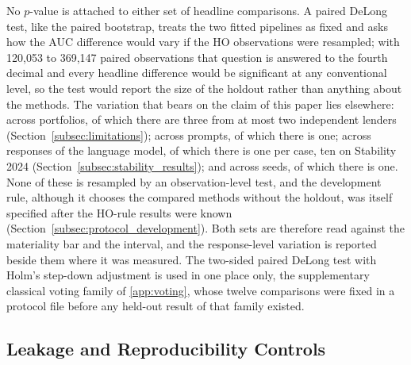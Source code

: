 \documentclass[final,5p,twocolumn]{elsarticle}
\begin{document}
No $p$-value is attached to either set of headline comparisons. A paired DeLong test, like the paired bootstrap, treats the two fitted pipelines as fixed and asks how the AUC difference would vary if the HO observations were resampled; with 120,053 to 369,147 paired observations that question is answered to the fourth decimal and every headline difference would be significant at any conventional level, so the test would report the size of the holdout rather than anything about the methods. The variation that bears on the claim of this paper lies elsewhere: across portfolios, of which there are three from at most two independent lenders (Section~\ref{subsec:limitations}); across prompts, of which there is one; across responses of the language model, of which there is one per case, ten on Stability 2024 (Section~\ref{subsec:stability_results}); and across seeds, of which there is one. None of these is resampled by an observation-level test, and the development rule, although it chooses the compared methods without the holdout, was itself specified after the HO-rule results were known (Section~\ref{subsec:protocol_development}). Both sets are therefore read against the materiality bar and the interval, and the response-level variation is reported beside them where it was measured. The two-sided paired DeLong test \cite{delong1988} with Holm's step-down adjustment \cite{holm1979} is used in one place only, the supplementary classical voting family of \ref{app:voting}, whose twelve comparisons were fixed in a protocol file before any held-out result of that family existed.

\subsection{Leakage and Reproducibility Controls}
\label{subsec:leakage_controls}
\end{document}
